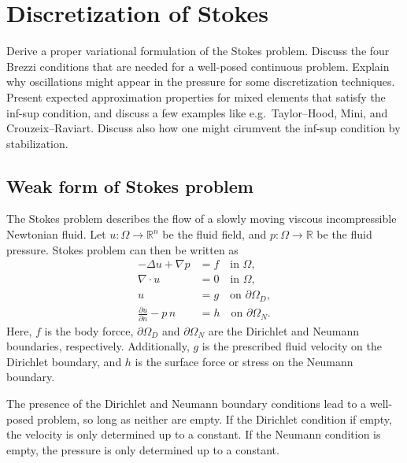 \section{Discretization of Stokes}
Derive a proper variational formulation of the Stokes problem.
Discuss the four Brezzi conditions that are needed for a well-posed continuous problem.
Explain why oscillations might appear in the pressure for some discretization techniques.
Present expected approximation properties for mixed elements that satisfy the inf-sup condition, and discuss a few examples like e.g.\ Taylor--Hood, Mini, and Crouzeix--Raviart. %
Discuss also how one might cirumvent the inf-sup condition by stabilization.

\subsection{Weak form of Stokes problem}
The Stokes problem describes the flow of a slowly moving viscous incompressible Newtonian fluid.
Let $u : \Omega \to \mathbb{R}^n$ be the fluid field, and $p: \Omega \to \mathbb{R}$ be the fluid pressure.
Stokes problem can then be written as
\begin{equation}
    \begin{split}
        -\Delta u + \nabla p &= f \quad \text{in } \Omega, \\
        \nabla \cdot u &= 0 \quad \text{in } \Omega, \\
        u &= g \quad \text{on } \partial\Omega_D, \\
        \frac{\partial u}{\partial n} - p \, n &= h \quad \text{on } \partial\Omega_N.
    \end{split}
\end{equation}
Here, $f$ is the body forcce, $\partial\Omega_D$ and $\partial\Omega_N$ are the Dirichlet and Neumann boundaries, respectively.
Additionally, $g$ is the prescribed fluid velocity on the Dirichlet boundary, and $h$ is the surface force or stress on the Neumann boundary.

The presence of the Dirichlet and Neumann boundary conditions lead to a well-posed problem, so long as neither are empty.
If the Dirichlet condition if empty, the velocity is only determined up to a constant.
If the Neumann condition is empty, the pressure is only determined up to a constant.

